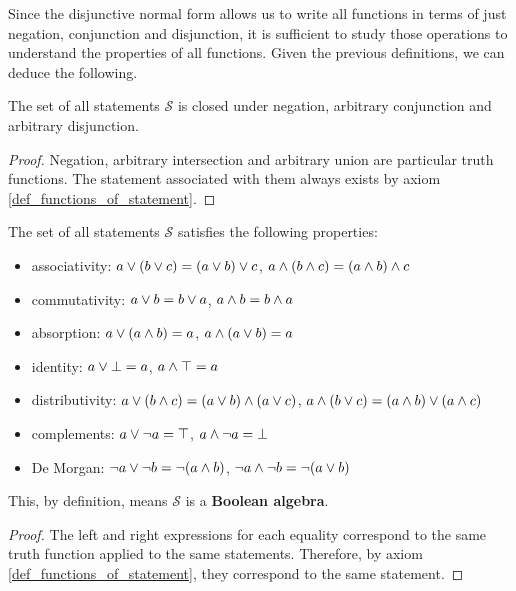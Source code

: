 \documentclass[11pt,letterpaper,fleqn]{memoir} %
\begin{document}
Since the disjunctive normal form allows us to write all functions in terms of just negation, conjunction and disjunction, it is sufficient to study those operations to understand the properties of all functions. Given the previous definitions, we can deduce the following.

\begin{mathSection}
	\begin{prop}
		The set of all statements $\mathcal{S}$ is closed under negation, arbitrary conjunction and arbitrary disjunction.
	\end{prop}
	\begin{proof}
		Negation, arbitrary intersection and arbitrary union are particular truth functions. The statement associated with them always exists by axiom \eqref{def_functions_of_statement}.
	\end{proof}
	\begin{prop}\label{boolean_properties}
		The set of all statements $\mathcal{S}$ satisfies the following properties:
		\begin{itemize}
			\item associativity: $a \vee (b \vee c) = (a \vee b) \vee c$, $a \wedge (b \wedge c) = (a \wedge b) \wedge c$
			\item commutativity: $a \vee b = b \vee a$, $a \wedge b = b \wedge a$
			\item absorption: $a \vee (a \wedge b) = a$, $a \wedge (a \vee b) = a$
			\item identity: $a \vee \bot = a
			$, $a \wedge \top = a$
			\item distributivity: $a \vee (b \wedge c) = (a \vee b) \wedge (a \vee c)$, $a \wedge (b \vee c) = (a \wedge b) \vee (a \wedge c)$
			\item complements: $a \vee \neg a = \top$, $a \wedge \neg a = \bot$
			\item De Morgan: $\neg a \vee \neg b = \neg (a \wedge b)$, $\neg a \wedge \neg b = \neg (a \vee b)$
		\end{itemize}
		This, by definition, means $\mathcal{S}$ is a \textbf{Boolean algebra}.
	\end{prop}
	\begin{proof}
		The left and right expressions for each equality correspond to the same truth function applied to the same statements. Therefore, by axiom  \eqref{def_functions_of_statement}, they correspond to the same statement.
	\end{proof}
\end{mathSection}
\end{document}
